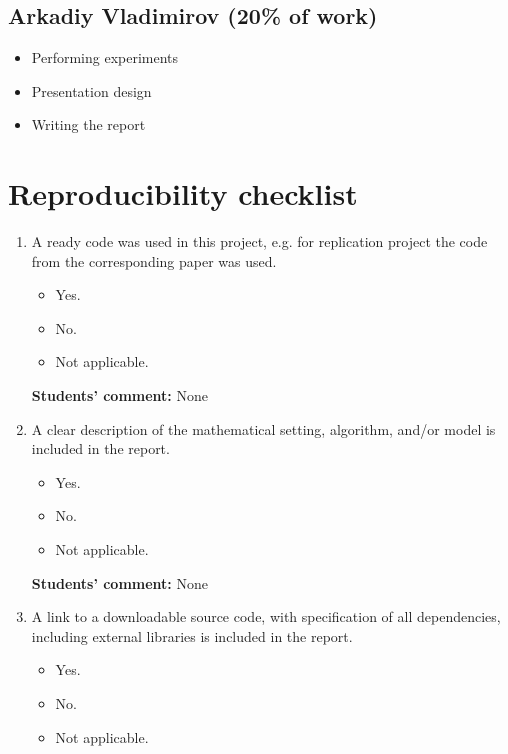 \documentclass{article}
\begin{document}
\subsection*{Arkadiy Vladimirov (20\% of work)}
\begin{itemize}
    \item Performing experiments
    \item Presentation design
    \item Writing the report
\end{itemize}

\newpage
\section{Reproducibility checklist}
\label{appendix-checklist}

    \begin{enumerate}
    \item A ready code was used in this project, e.g. for replication project the code from the corresponding paper was used.
    \begin{itemize}
        \item [\faSquareO] Yes.
        \item [\faCheckSquareO] No.
        \item [\faSquareO] Not applicable.
    \end{itemize}
    
    \textbf{Students' comment:} None
    \item A clear description of the mathematical setting, algorithm, and/or model is included in the report.
    \begin{itemize}
        \item [\faCheckSquareO] Yes.
        \item [\faSquareO] No.
        \item [\faSquareO] Not applicable.
    \end{itemize}
    
    \textbf{Students' comment:} None
    
    \item A link to a downloadable source code, with specification of all dependencies, including external libraries is included in the report.
    \begin{itemize}
        \item [\faCheckSquareO] Yes.
        \item [\faSquareO] No.
        \item [\faSquareO] Not applicable.
    \end{itemize}
    

\end{enumerate}
\end{document}
